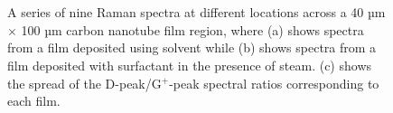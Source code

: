 \documentclass[
  a4paper,
]{scrbook}
\begin{document}
\begin{figure}
\begin{minipage}[t]{0.47\linewidth}
{{}

}

\subcaption{\label{fig-surfactant-deposited}}
\end{minipage}%
\newline
\begin{minipage}[t]{0.33\linewidth}

{\centering 

~

}

\end{minipage}%
%
\begin{minipage}[t]{0.35\linewidth}

{\centering 


}

\subcaption{\label{fig-dg-peak-comparison}}
\end{minipage}%
%
\begin{minipage}[t]{0.33\linewidth}

{\centering 

~

}

\end{minipage}%

\caption{\label{fig-pristine-raman}A series of nine Raman spectra at
different locations across a 40 µm \(\times\) 100 µm carbon nanotube
film region, where (a) shows spectra from a film deposited using solvent
while (b) shows spectra from a film deposited with surfactant in the
presence of steam. (c) shows the spread of the D-peak/G\(^+\)-peak
spectral ratios corresponding to each film.}

\end{figure}
\end{document}
